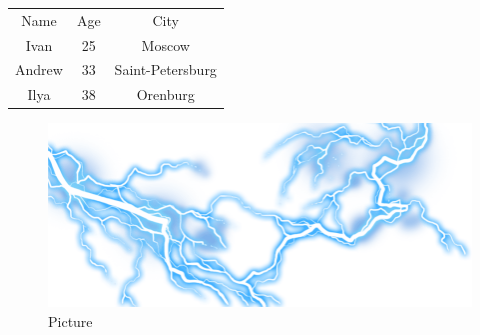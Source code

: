 \documentclass[12pt]{article}
\title{}
\author{}
\date{}
\begin{document}
\maketitle
\thispagestyle{empty}
\begin{tabular}{ |c|c|c| }
\hline
Name & Age & City \\
Ivan & 25 & Moscow \\
Andrew & 33 & Saint-Petersburg \\
Ilya & 38 & Orenburg \\
\end{tabular}
\begin{figure}[h]
\centering
\includegraphics[width=0.8\linewidth]{1.png}
\caption{Picture}
\label{fig:mpr}
\end{figure}
\end{document}
